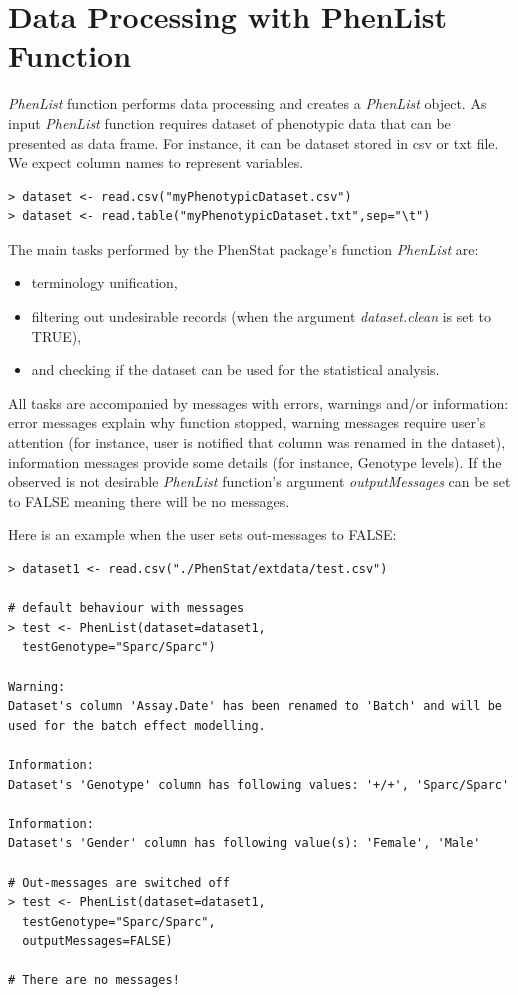 \documentclass[12pt,a4paper]{article}
\begin{document}
\section{Data Processing with PhenList Function}
\textit{PhenList} function performs data processing and creates a \textit{PhenList} object. 
As input \textit{PhenList} function requires dataset of phenotypic data that can be presented as data frame. For instance, it can be dataset stored in csv or txt file. We expect column names to represent variables.
\begingroup
    \fontsize{8pt}{12pt}\selectfont
\begin{verbatim}
> dataset <- read.csv("myPhenotypicDataset.csv")
> dataset <- read.table("myPhenotypicDataset.txt",sep="\t")
\end{verbatim}
\endgroup

The main tasks performed by the PhenStat package's function \textit{PhenList} are:
\begin{itemize}
\item terminology unification,
\item filtering out undesirable records (when the argument \textit{dataset.clean} is set to TRUE),
\item and checking if the dataset can be used for the statistical analysis.
\end{itemize}

All tasks are accompanied by messages with errors, warnings and/or information: error messages explain why function stopped, 
warning messages require user's attention (for instance, user is notified that column was renamed in the dataset), information messages provide some details (for instance, Genotype levels). 
If the observed is not desirable \textit{PhenList} function's argument \textit{outputMessages} can be set to FALSE meaning there will be no messages.

Here is an example when the user sets out-messages to FALSE: 

\begingroup
    \fontsize{8pt}{12pt}\selectfont
\begin{verbatim}
> dataset1 <- read.csv("./PhenStat/extdata/test.csv")

# default behaviour with messages
> test <- PhenList(dataset=dataset1,
  testGenotype="Sparc/Sparc")

Warning:
Dataset's column 'Assay.Date' has been renamed to 'Batch' and will be used for the batch effect modelling.

Information:
Dataset's 'Genotype' column has following values: '+/+', 'Sparc/Sparc'

Information:
Dataset's 'Gender' column has following value(s): 'Female', 'Male'

# Out-messages are switched off 
> test <- PhenList(dataset=dataset1,
  testGenotype="Sparc/Sparc",
  outputMessages=FALSE)
  
# There are no messages!
\end{verbatim}
\endgroup
\end{document}

